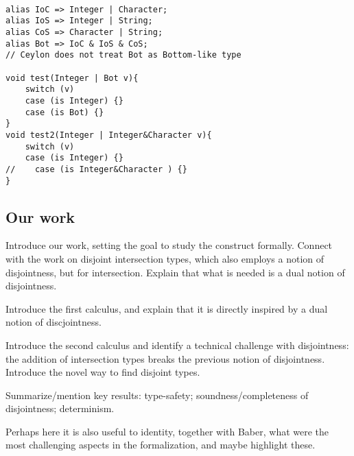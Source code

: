 
\begin{verbatim}

alias IoC => Integer | Character;
alias IoS => Integer | String;
alias CoS => Character | String;
alias Bot => IoC & IoS & CoS;
// Ceylon does not treat Bot as Bottom-like type

void test(Integer | Bot v){
    switch (v)
    case (is Integer) {}
    case (is Bot) {}
}
void test2(Integer | Integer&Character v){
    switch (v)
    case (is Integer) {}
//    case (is Integer&Character ) {}
}

\end{verbatim}

\subsection{Our work}


Introduce our work, setting the goal to study the construct formally.
Connect with the work on disjoint intersection types, which also
employs a notion of disjointness, but for intersection. Explain that
what is needed is a dual notion of disjointness.

Introduce the first calculus, and explain that it is directly inspired
by a dual notion of discjointness.

Introduce the second calculus and identify a technical challenge with
disjointness: the addition of intersection types breaks the previous
notion of disjointness. Introduce the novel way to find disjoint types.

Summarize/mention key results: type-safety; soundness/completeness of
disjointness; determinism.

Perhaps here it is also useful to identity, together with Baber, what
were the most challenging aspects in the formalization, and maybe
highlight these.

